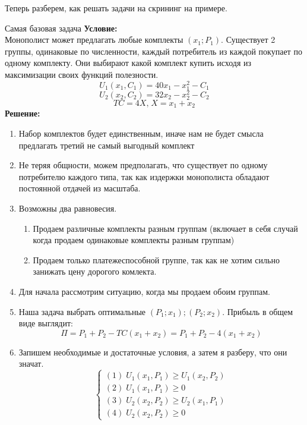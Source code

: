 Теперь разберем, как решать задачи на скрининг на примере.\smallskip

\begin{mybox}{Самая базовая задача}
    \textbf{Условие:}\\ Монополист может предлагать любые комплекты $(x_1;P_1)$. Существует 2 группы, одинаковые по
    численности, каждый потребитель из каждой покупает по одному комплекту. Они выбирают какой комплект купить исходя из
    максимизации своих функций полезности. \\
    $$U_1(x_1,C_1)=40x_1-x_1^2-C_1$$
    $$U_2(x_2,C_2)=32x_2-x_2^2-C_2$$
    $$TC=4X\text{,}\;X=x_1+x_2$$
    \tcblower
    \textbf{Решение:}
    \begin{enumerate}
        \item Набор комплектов будет единственным, иначе нам не будет смысла предлагать третий не самый выгодный
        комплект
        \item Не теряя общности, можем предполагать, что существует по одному потребителю каждого типа, так как издержки
        монополиста обладают постоянной отдачей из масштаба.
        \item Возможны два равновесия. \begin{enumerate}
            \item Продаем различные комплекты разным группам (включает в себя случай когда продаем одинаковые комплекты
            разным группам)
            \item Продаем только платежеспособной группе, так как не хотим сильно занижать цену дорогого комлекта.
        \end{enumerate}
        \item Для начала рассмотрим ситуацию, когда мы продаем обоим группам.
        \item Наша задача выбрать оптимальные $(P_1;x_1);(P_2;x_2)$. Прибыль в общем виде выглядит:
        $$\Pi=P_1+P_2-TC(x_1+x_2)=P_1+P_2-4(x_1+x_2)$$
        \item Запишем необходимые и достаточные условия, а затем я разберу, что они значат.
        \begin{equation*}
         \begin{cases}
           (1)\;U_1(x_1,P_1)\geq U_1(x_2,P_2)
           \\
           (2)\;U_1(x_1,P_1)\geq 0
           \\
           (3)\;U_2(x_2,P_2)\geq U_2(x_1,P_1)
           \\
           (4)\;U_2(x_2,P_2)\geq 0
         \end{cases}

\end{equation*}
\end{enumerate}
\end{mybox}

